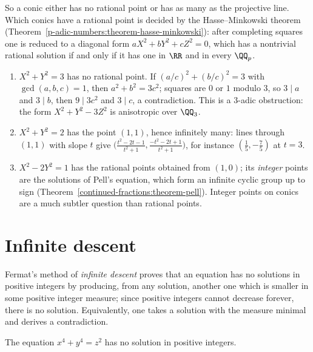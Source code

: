So a conic either has no rational point or has as many as the projective line. Which conics have a rational point is decided by the Hasse--Minkowski theorem
(Theorem~\ref{p-adic-numbers:theorem-hasse-minkowski}): after completing squares one is reduced to a diagonal form $aX^2 + bY^2 + cZ^2 = 0$, which has a nontrivial rational solution if and only if it has one in
$\RR$ and in every $\QQ_p$.

\begin{example}\label{diophantine-equations:example-conics}
\begin{enumerate}
\item $X^2 + Y^2 = 3$ has no rational point. If $(a/c)^2 + (b/c)^2 = 3$ with $\gcd(a, b, c) = 1$, then $a^2 + b^2 = 3c^2$; squares are $0$ or $1$ modulo $3$, so $3 \mid a$ and $3 \mid b$, then $9 \mid 3c^2$ and
$3 \mid c$, a contradiction. This is a $3$-adic obstruction: the form $X^2 + Y^2 - 3Z^2$ is anisotropic over $\QQ_3$.
\item $X^2 + Y^2 = 2$ has the point $(1, 1)$, hence infinitely many: lines through $(1, 1)$ with slope $t$ give $\bigl(\frac{t^2 - 2t - 1}{t^2 + 1}, \frac{-t^2 - 2t + 1}{t^2 + 1}\bigr)$, for instance
$(\frac15, -\frac75)$ at $t = 3$.
\item $X^2 - 2Y^2 = 1$ has the rational points obtained from $(1, 0)$; its \emph{integer} points are the solutions of Pell's equation, which form an infinite cyclic group up to sign
(Theorem~\ref{continued-fractions:theorem-pell}). Integer points on conics are a much subtler question than rational points.
\end{enumerate}
\end{example}

\section{Infinite descent}\label{diophantine-equations:section-descent}

Fermat's method of \emph{infinite descent} proves that an equation has no solutions in positive integers by producing, from any solution, another one which is smaller in some positive integer measure; since
positive integers cannot decrease forever, there is no solution. Equivalently, one takes a solution with the measure minimal and derives a contradiction.

\begin{theorem}[Fermat]\label{diophantine-equations:theorem-four-plus}
The equation $x^4 + y^4 = z^2$ has no solution in positive integers.
\end{theorem}

